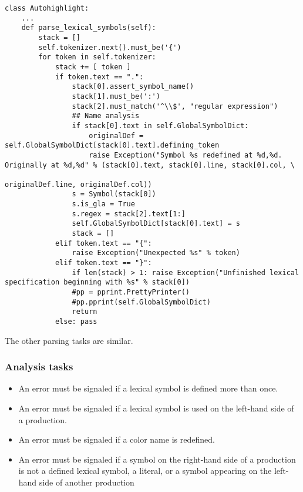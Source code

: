 \documentclass[]{article}
\begin{document}
  \begin{lstlisting}
class Autohighlight:
    ...
    def parse_lexical_symbols(self):
        stack = []
        self.tokenizer.next().must_be('{')
        for token in self.tokenizer:
            stack += [ token ]
            if token.text == ".":
                stack[0].assert_symbol_name()
                stack[1].must_be(':')
                stack[2].must_match('^\\$', "regular expression")
                ## Name analysis
                if stack[0].text in self.GlobalSymbolDict:
                    originalDef = self.GlobalSymbolDict[stack[0].text].defining_token
                    raise Exception("Symbol %s redefined at %d,%d. Originally at %d,%d" % (stack[0].text, stack[0].line, stack[0].col, \
                                                                                           originalDef.line, originalDef.col))
                s = Symbol(stack[0])
                s.is_gla = True
                s.regex = stack[2].text[1:]
                self.GlobalSymbolDict[stack[0].text] = s
                stack = []
            elif token.text == "{":
                raise Exception("Unexpected %s" % token)
            elif token.text == "}":
                if len(stack) > 1: raise Exception("Unfinished lexical specification beginning with %s" % stack[0])
                #pp = pprint.PrettyPrinter()
                #pp.pprint(self.GlobalSymbolDict)
                return
            else: pass
  \end{lstlisting} %

  The other parsing tasks are similar.

  \subsubsection{Analysis tasks}
  \begin{itemize}
  \item An error must be signaled if a lexical symbol is defined more
    than once.
  \item An error must be signaled if a lexical symbol is used on the
    left-hand side of a production.
  \item An error must be signaled if a color name is redefined.
  \item An error must be signaled if a symbol on the right-hand side
    of a production is not a defined lexical symbol, a literal, or a symbol
    appearing on the left-hand side of another production
  \end{itemize}
  
\end{document}
